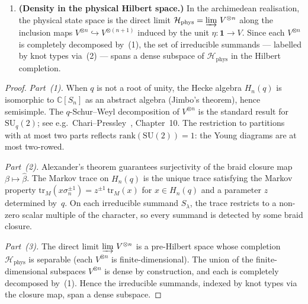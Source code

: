 \begin{proposition}
\begin{enumerate}
    is supported, has image containing every irreducible summand.
  \item \textbf{(Density in the physical Hilbert space.)}  In the
    archimedean realisation, the physical state space is the direct limit
    $\mathcal{H}_{\mathrm{phys}} = \varinjlim\, V^{\otimes n}$ along
    the inclusion maps
    $V^{\otimes n} \hookrightarrow V^{\otimes (n+1)}$ induced by the
    unit $\eta \colon \mathbf{1} \to V$.  Since each $V^{\otimes n}$ is
    completely decomposed by~(1), the set of irreducible summands ---
    labelled by knot types via~(2) --- spans a dense subspace of
    $\mathcal{H}_{\mathrm{phys}}$ in the Hilbert completion.
\end{enumerate}
\end{proposition}

\begin{proof}
\emph{Part~(1).}  When $q$ is not a root of unity, the Hecke algebra
$H_n(q)$ is isomorphic to $\mathbb{C}[S_n]$ as an abstract algebra
(Jimbo's theorem), hence semisimple.  The $q$-Schur--Weyl
decomposition of $V^{\otimes n}$ is the standard result for
$\mathrm{SU}_q(2)$; see e.g.\ Chari--Pressley~\cite{chari1994guide},
Chapter~10.  The restriction to partitions with at most two parts
reflects $\mathrm{rank}(\mathrm{SU}(2)) = 1$: the Young diagrams are
at most two-rowed.

\emph{Part~(2).}  Alexander's theorem guarantees surjectivity of the
braid closure map $\beta \mapsto \hat{\beta}$.  The Markov trace on
$H_n(q)$ is the unique trace satisfying the Markov property
$\mathrm{tr}_M(x \sigma_n^{\pm 1}) = z^{\pm 1}\,\mathrm{tr}_M(x)$ for
$x \in H_n(q)$ and a parameter $z$ determined by~$q$.  On each
irreducible summand $S_\lambda$, the trace restricts to a non-zero
scalar multiple of the character, so every summand is detected by
some braid closure.

\emph{Part~(3).}  The direct limit $\varinjlim\, V^{\otimes n}$ is a
pre-Hilbert space whose completion $\mathcal{H}_{\mathrm{phys}}$ is
separable (each $V^{\otimes n}$ is finite-dimensional).  The union of
the finite-dimensional subspaces $V^{\otimes n}$ is dense by
construction, and each is completely decomposed by~(1).  Hence the
irreducible summands, indexed by knot types via the closure map,
span a dense subspace.
\end{proof}

